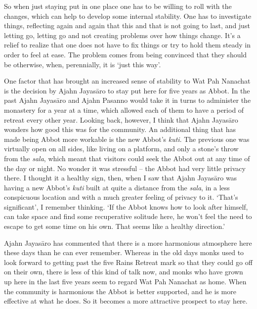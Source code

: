 So when just staying put in one place one has to be willing to roll with
the changes, which can help to develop some internal stability. One has
to investigate things, reflecting again and again that this and that is
not going to last, and just letting go, letting go and not creating
problems over how things change. It's a relief to realize that one does
not have to fix things or try to hold them steady in order to feel at
ease. The problem comes from being convinced that they should be
otherwise, when, perennially, it is `just this way'.

One factor that has brought an increased sense of stability to Wat Pah
Nanachat is the decision by Ajahn Jayasāro to stay put here for five
years as Abbot. In the past Ajahn Jayasāro and Ajahn Pasanno would take
it in turns to administer the monastery for a year at a time, which
allowed each of them to have a period of retreat every other year.
Looking back, however, I think that Ajahn Jayasāro wonders how good this
was for the community. An additional thing that has made being Abbot
more workable is the new Abbot's \emph{kuti}. The previous one was
virtually open on all sides, like living on a platform, and only a
stone's throw from the \emph{sala}, which meant that visitors could seek
the Abbot out at any time of the day or night. No wonder it was
stressful -- the Abbot had very little privacy there. I thought it a
healthy sign, then, when I saw that Ajahn Jayasāro was having a new
Abbot's \emph{kuti} built at quite a distance from the \emph{sala}, in a
less conspicuous location and with a much greater feeling of privacy to
it. `That's significant', I remember thinking. `If the Abbot knows how
to look after himself, can take space and find some recuperative
solitude here, he won't feel the need to escape to get some time on his
own. That seems like a healthy direction.'

Ajahn Jayasāro has commented that there is a more harmonious atmosphere
here these days than he can ever remember. Whereas in the old days monks
used to look forward to getting past the five Rains Retreat mark so that
they could go off on their own, there is less of this kind of talk now,
and monks who have grown up here in the last five years seem to regard
Wat Pah Nanachat as home. When the community is harmonious the Abbot is
better supported, and he is more effective at what he does. So it
becomes a more attractive prospect to stay here.

